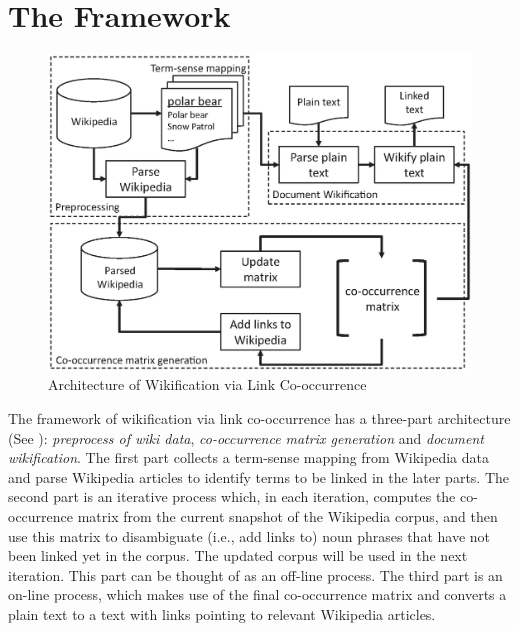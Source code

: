 \section{The Framework}
\label{sec:framework}
\begin{figure}[!h]
\begin{center}
\includegraphics[width=\columnwidth]{flowchat.eps}
\caption{Architecture of Wikification via Link Co-occurrence}
\label{fig:arch}
\end{center}
\end{figure}

The framework of wikification via link co-occurrence
has a three-part architecture (See
): {\em preprocess of wiki data},
{\em co-occurrence matrix generation} and {\em document wikification}.
The first part collects a term-sense mapping from Wikipedia data and
parse Wikipedia articles to identify terms to be linked in the later parts.
The second part is an iterative process which, in each iteration, computes
the co-occurrence matrix from the current snapshot of the Wikipedia corpus,
and then use this matrix to disambiguate (i.e., add links to) noun phrases that
have not been linked yet in the corpus. The updated corpus will be used
in the next iteration. This part can be thought of as an off-line process.
The third part is an on-line process, which makes use of the final
co-occurrence matrix and converts a plain text to a text with links pointing
to relevant Wikipedia articles.


